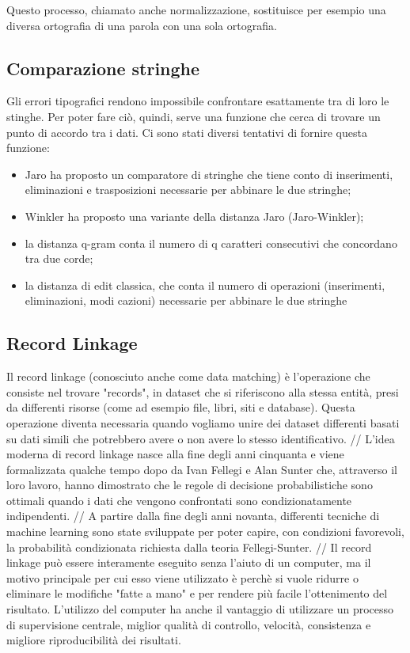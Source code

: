 \documentclass[a4paper,12pt]{article}
\begin{document}
Questo processo, chiamato anche normalizzazione, sostituisce per esempio una diversa ortografia di una parola con una sola ortografia.

\subsection{Comparazione stringhe}

Gli errori tipografici rendono impossibile confrontare esattamente tra di loro le stinghe.  Per poter fare ciò, quindi, serve una funzione che cerca di trovare un punto di accordo tra i dati. Ci sono stati diversi tentativi di fornire questa funzione:

\begin{itemize}
\item Jaro ha proposto un comparatore di stringhe che tiene conto di inserimenti, eliminazioni e trasposizioni necessarie per abbinare le due stringhe;
\item Winkler ha proposto una variante della distanza Jaro (Jaro-Winkler);
\item la distanza q-gram conta il numero di q caratteri consecutivi che concordano tra due corde;
\item la distanza di edit classica, che conta il numero di operazioni (inserimenti, eliminazioni, modi cazioni) necessarie per abbinare le due stringhe
\end{itemize}

\subsection{Record Linkage}

Il record linkage (conosciuto anche come data matching) è l'operazione che consiste nel trovare "records", in dataset che si riferiscono alla stessa entità, presi da differenti risorse (come ad esempio file, libri, siti e database).
Questa operazione diventa necessaria quando vogliamo unire dei dataset differenti basati su dati simili che potrebbero avere o non avere lo stesso identificativo. //
L'idea moderna di record linkage nasce alla fine degli anni cinquanta e viene formalizzata qualche tempo dopo da Ivan Fellegi e Alan Sunter che, attraverso il loro lavoro, hanno dimostrato che le regole di decisione probabilistiche sono ottimali quando i dati che vengono confrontati sono condizionatamente indipendenti. //
A partire dalla fine degli anni novanta, differenti tecniche di machine learning sono state sviluppate per poter capire, con condizioni favorevoli, la probabilità condizionata richiesta dalla teoria Fellegi-Sunter. //
Il record linkage può essere interamente eseguito senza l'aiuto di un computer, ma il motivo principale per cui esso viene utilizzato è perchè si vuole ridurre o eliminare le modifiche "fatte a mano" e per rendere più facile l'ottenimento del risultato. 
L'utilizzo del computer ha anche il vantaggio di utilizzare un processo di supervisione centrale, miglior qualità di controllo, velocità, consistenza e migliore riproducibilità dei risultati. %
\end{document}
